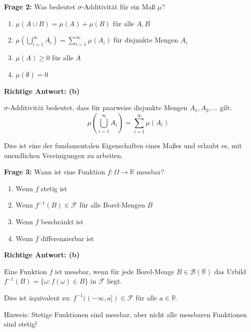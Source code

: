 \begin{multiplechoice}
\textbf{Frage 2:} Was bedeutet $\sigma$-Additivität für ein Maß $\mu$?

\begin{enumerate}[label=(\alph*)]
    \item $\mu(A \cup B) = \mu(A) + \mu(B)$ für alle $A, B$
    \item $\mu\left(\bigcup_{i=1}^{\infty} A_i\right) = \sum_{i=1}^{\infty} \mu(A_i)$ für disjunkte Mengen $A_i$
    \item $\mu(A) \geq 0$ für alle $A$
    \item $\mu(\emptyset) = 0$
\end{enumerate}

\begin{solution}
\textbf{Richtige Antwort: (b)}

$\sigma$-Additivität bedeutet, dass für paarweise disjunkte Mengen $A_1, A_2, \ldots$ gilt:
\[
\mu\left(\bigcup_{i=1}^{\infty} A_i\right) = \sum_{i=1}^{\infty} \mu(A_i)
\]

Dies ist eine der fundamentalen Eigenschaften eines Maßes und erlaubt es, mit unendlichen Vereinigungen zu arbeiten.
\end{solution}
\end{multiplechoice}

\begin{multiplechoice}
\textbf{Frage 3:} Wann ist eine Funktion $f: \Omega \to \mathbb{R}$ messbar?

\begin{enumerate}[label=(\alph*)]
    \item Wenn $f$ stetig ist
    \item Wenn $f^{-1}(B) \in \mathcal{F}$ für alle Borel-Mengen $B$
    \item Wenn $f$ beschränkt ist
    \item Wenn $f$ differenzierbar ist
\end{enumerate}

\begin{solution}
\textbf{Richtige Antwort: (b)}

Eine Funktion $f$ ist messbar, wenn für jede Borel-Menge $B \in \mathcal{B}(\mathbb{R})$ das Urbild $f^{-1}(B) = \{\omega : f(\omega) \in B\}$ in $\mathcal{F}$ liegt.

Dies ist äquivalent zu: $f^{-1}((-\infty, a]) \in \mathcal{F}$ für alle $a \in \mathbb{R}$.

Hinweis: Stetige Funktionen sind messbar, aber nicht alle messbaren Funktionen sind stetig!
\end{solution}
\end{multiplechoice}

